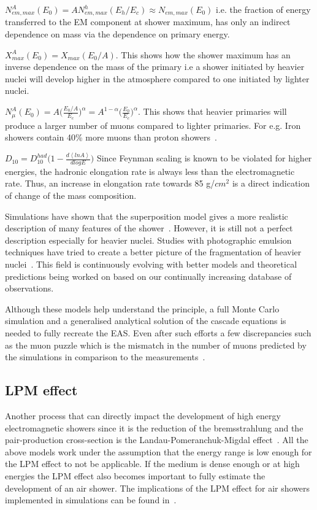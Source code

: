 \begin{description}
    \item $N_{em,max}^A(E_0) = A N_{em,max}^h(E_h/E_c) \approx N_{em,max}(E_0) $ i.e. the fraction of energy transferred to the EM component at shower maximum, has only an indirect dependence on mass via the dependence on primary energy.
    \item $X_{max}^A(E_0) = X_{max}(E_0/A)$. This shows how the shower maximum has an inverse dependence on the mass of the primary i.e a shower initiated by heavier nuclei will develop higher in the atmosphere compared to one initiated by lighter nuclei.
    \item $N_{\mu}^A(E_0) =  A \biggl(\frac{E_0/A}{E_{c}}\biggr)^{\alpha} = A^{1-\alpha} \biggl(\frac{E_0}{E_c}\biggr)^{\alpha}$. This shows that heavier primaries will produce a larger number of muons compared to lighter primaries. For e.g. Iron showers contain 40\% more muons than proton showers~\cite{Fowler_2001}.
    \item $D_{10} = D_{10}^{had} \Biggl(1- \frac{d\left\langle ln A\right\rangle}{dlogE}\Biggr)$ Since Feynman scaling is known to be violated for higher energies, the hadronic elongation rate is always less than the electromagnetic rate. Thus, an increase in elongation rate towards 85 g/$cm^2$ is a direct indication of change of the mass composition. 
\end{description}
Simulations have shown that the superposition model gives a more realistic description of many features of the shower~\cite{Wibig_2022}. However, it is still not a perfect description especially for heavier nuclei. Studies with photographic emulsion techniques have tried to create a better picture of the fragmentation of heavier nuclei~\cite{LI2013503}. This field is continuously evolving with better models and theoretical predictions being worked on based on our continually increasing database of observations. 

Although these models help understand the principle, a full Monte Carlo simulation and a generalised analytical solution of the cascade equations is needed to fully recreate the EAS. Even after such efforts a few discrepancies such as the muon puzzle which is the mismatch in the number of muons predicted by the simulations in comparison to the measurements~\cite{Albrecht_2022_muon_puzzle}.  

\subsection{LPM effect}
\label{subsec:LPM}
Another process that can directly impact the development of high energy electromagnetic showers since it is the reduction of the bremsstrahlung and the pair-production cross-section is the Landau-Pomeranchuk-Migdal effect~\cite{Landau:1953um,PhysRev.103.1811}. All the above models work under the assumption that the energy range is low enough for the LPM effect to not be applicable. If the medium is dense enough or at high energies the LPM effect also becomes important to fully estimate the development of an air shower. The implications of the LPM effect for air showers implemented in simulations can be found in~\cite{sandrock2023validationelectromagneticshowerscorsika}. 

